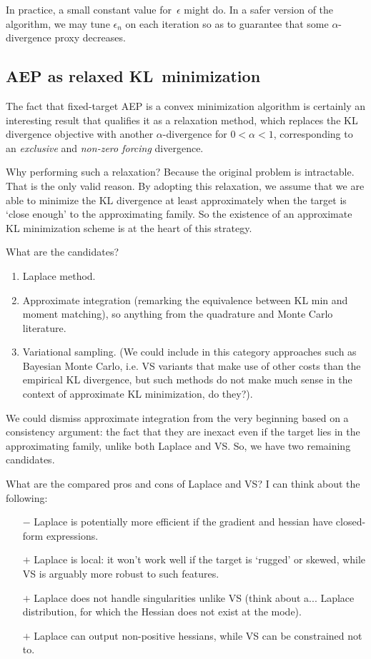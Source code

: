 \documentclass{article}
\begin{document}

In practice, a small constant value for~$\epsilon$ might do. In a safer version of the algorithm, we may tune $\epsilon_n$ on each iteration so as to guarantee that some $\alpha$-divergence proxy decreases.


\subsection{AEP as relaxed KL~minimization}

The fact that fixed-target AEP is a convex minimization algorithm is certainly an interesting result that qualifies it as a relaxation method, which replaces the KL divergence objective with another $\alpha$-divergence for $0<\alpha<1$, corresponding to an {\em exclusive} and {\em non-zero forcing} divergence. 

Why performing such a relaxation? Because the original problem is intractable. That is the only valid reason. By adopting this relaxation, we assume that we are able to minimize the KL divergence at least approximately when the target is `close enough' to the approximating family. So the existence of an approximate KL minimization scheme is at the heart of this strategy.

What are the candidates? 
\begin{enumerate}
\item Laplace method.
\item Approximate integration (remarking the equivalence between KL min and moment matching), so anything from the quadrature and Monte Carlo literature.
\item Variational sampling. (We could include in this category approaches such as Bayesian Monte Carlo, i.e. VS variants that make use of other costs than the empirical KL divergence, but such methods do not make much sense in the context of approximate KL minimization, do they?). 
\end{enumerate}

We could dismiss approximate integration from the very beginning based on a consistency argument: the fact that they are inexact even if the target lies in the approximating family, unlike both Laplace and VS. So, we have two remaining candidates.

What are the compared pros and cons of Laplace and VS? I can think about the following:
\begin{itemize}
\item[$-$] Laplace is potentially more efficient if the gradient and hessian have closed-form expressions.
\item[$+$] Laplace is local: it won't work well if the target is `rugged' or skewed, while VS is arguably more robust to such features. 
\item[$+$] Laplace does not handle singularities unlike VS (think about a... Laplace distribution, for which the Hessian does not exist at the mode).
\item[$+$] Laplace can output non-positive hessians, while VS can be constrained not to.
\end{itemize}
\end{document}
